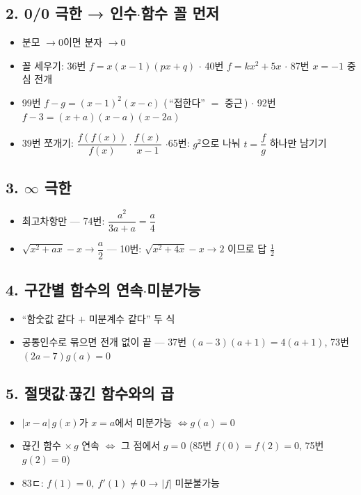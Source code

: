 \documentclass[11pt,a4paper]{article}
\begin{document}
\subsection{2. 0/0 극한 → 인수$\cdot$함수 꼴 먼저 }
\begin{itemize}
\item 분모 $\to0$이면 분자 $\to0$
\item 꼴 세우기: 36번 $f=x(x-1)(px+q)$ \;$\cdot$\; 40번 $f=kx^2+5x$ \;$\cdot$\; 87번 $x=-1$ 중심 전개
\item 99번 $f-g=(x-1)^2(x-c)$ (\,``접한다'' $=$ 중근\,) \;$\cdot$\; 92번 $f-3=(x+a)(x-a)(x-2a)$
\item 39번 쪼개기: $\dfrac{f(f(x))}{f(x)}\cdot\dfrac{f(x)}{x-1}$ $\cdot$65번: $g^2$으로 나눠 $t=\dfrac fg$ 하나만 남기기
\end{itemize}

\subsection{3. $\infty$ 극한 }
\begin{itemize}
\item 최고차항만 — 74번: $\dfrac{a^2}{3a+a}=\dfrac a4$
\item $\sqrt{x^2+ax}-x\to\dfrac a2$ — 10번: $\sqrt{x^2+4x}-x\to2$ 이므로 답 $\tfrac12$
\end{itemize}

\subsection{4. 구간별 함수의 연속$\cdot$미분가능 }
\begin{itemize}
\item ``함숫값 같다 $+$ 미분계수 같다'' 두 식
\item 공통인수로 묶으면 전개 없이 끝 — 37번 $(a-3)(a+1)=4(a+1)$, 73번 $(2a-7)g(a)=0$
\end{itemize}

\subsection{5. 절댓값$\cdot$끊긴 함수와의 곱 }
\begin{itemize}
\item $|x-a|\,g(x)$가 $x=a$에서 미분가능 $\iff g(a)=0$
\item 끊긴 함수 $\times\,g$ 연속 $\iff$ 그 점에서 $g=0$ \;(85번 $f(0)=f(2)=0$, 75번 $g(2)=0$)
\item 83ㄷ: $f(1)=0,\ f'(1)\neq0$ → $|f|$ 미분불가능
\end{itemize}
\end{document}
